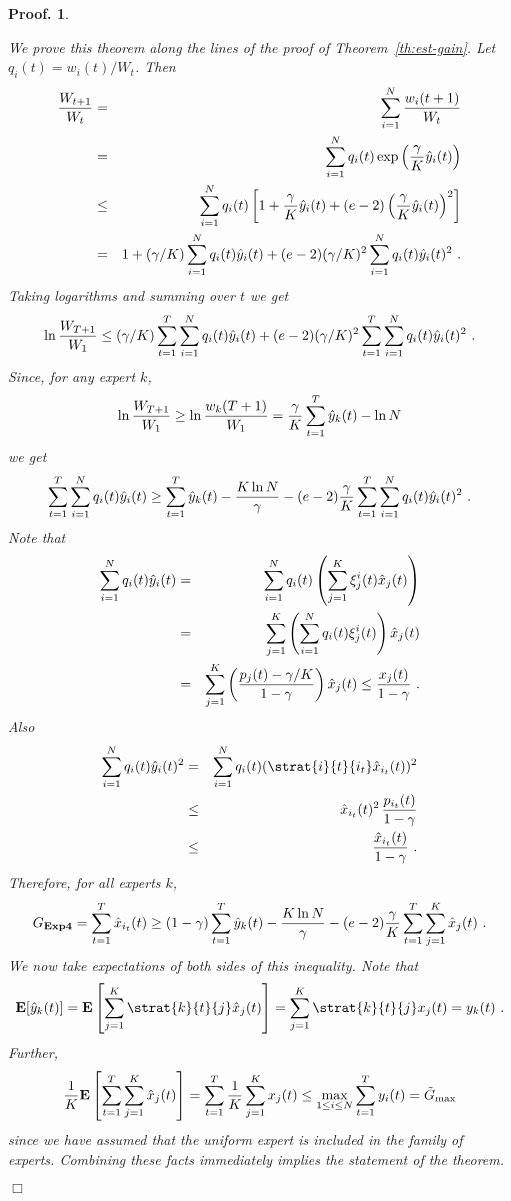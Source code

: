 \documentclass[12pt]{article}
\newcommand{\E}{\mbox{\rm\bf E}}
\newcommand{\Astrat}{{\bf Exp4}}
\newcommand{\brackets}[1]{\left[{#1}\right]}
\newcommand{\expb}[1]{\exp\left(#1\right)}
\newcommand{\x}[2]{x_{#1}({#2})}
\newcommand{\w}[2]{w_{#1}({#2})}
\renewcommand{\i}[1]{i_{#1}}
\newcommand{\Gbestst}{\tilde{G}_{\rm max}}
\newcommand{\p}[2]{p_{#1}(#2)}
\newcommand{\q}[2]{q_{#1}(#2)}
\newcommand{\hx}[2]{\hat{x}_{#1}(#2)}
\newcommand{\hxit}{\hx{\i{t}}{t}}
\newtheorem{pproof}{Proof.}
\newenvironment{proof}{
\begin{pproof}
        \begin{rm}\begin{rm}}{
        \hspace*{\fill} $\Box$
        \end{rm}\end{rm}
        \end{pproof}
}
\begin{document}
\begin{proof}
We prove this theorem along the lines of the proof of Theorem~\ref{th:est-gain}.
Let $\q{i}{t} = \w{i}{t}/W_t$. Then
\begin{eqnarray*}
        \frac{W_{t+1}}{W_{t}} 
& = &
        \sum_{i=1}^N \frac{\w{i}{t+1}}{W_t}
\\ & = &
        \sum_{i=1}^N \q{i}{t} \expb{\frac{\gamma}{K}\hy{i}{t}}
\\ & \leq &
        \sum_{i=1}^N \q{i}{t}
    \left[1 + \frac{\gamma}{K}\hy{i}{t}
        + (e-2)\left(\frac{\gamma}{K}\hy{i}{t}\right)^2 \right]
\\ & = &
        1 + (\gamma/K)\sum_{i=1}^N \q{i}{t} \hy{i}{t}
    + (e-2)(\gamma/K)^2\sum_{i=1}^N \q{i}{t} \hy{i}{t}^2~.
\end{eqnarray*}
Taking logarithms and summing over $t$ we get
\[
        \ln\frac{W_{T+1}}{W_1} \leq (\gamma/K) \sum_{t=1}^T\sum_{i=1}^N \q{i}{t} \hy{i}{t}
        + (e-2)(\gamma/K)^2 \sum_{t=1}^T\sum_{i=1}^N \q{i}{t}\hy{i}{t}^2~.
\]
Since, for any expert $k$,
\[
        \ln\frac{W_{T+1}}{W_1} \geq \ln\frac{\w{k}{T+1}}{W_1}
        = \frac{\gamma}{K}\sum_{t=1}^T \hy{k}{t} - \ln N
\]
we get
\[
    \sum_{t=1}^T \sum_{i=1}^N \q{i}{t}\hy{i}{t}
\geq
    \sum_{t=1}^T \hy{k}{t} - \frac{K\ln N}{\gamma}
    - (e-2)\frac{\gamma}{K}\sum_{t=1}^T\sum_{i=1}^N \q{i}{t}\hy{i}{t}^2~.
\]
Note that
\begin{eqnarray*}
        \sum_{i=1}^N \q{i}{t}\hy{i}{t}
        &=& \sum_{i=1}^N \q{i}{t}\left(\sum_{j=1}^K \xi^i_j(t) \hx{j}{t} \right)
\\ &=&
        \sum_{j=1}^K \left( \sum_{i=1}^N \q{i}{t} \xi^i_j(t) \right) \hx{j}{t}
\\ &=&
        \sum_{j=1}^K \left( \frac{\p{j}{t}-\gamma/K}{1-\gamma} \right) \hx{j}{t}
    \leq \frac{\x{j}{t}}{1-\gamma}~.
\end{eqnarray*}
Also
\begin{eqnarray*}
\sum_{i=1}^N \q{i}{t} \hy{i}{t}^2
&=&
        \sum_{i=1}^N \q{i}{t} (\strat{i}{t}{i_t} \hxit)^2
\\ & \leq &
        \hxit^2\,\frac{\p{i_t}{t}}{1-\gamma}
\\ & \leq &
        \frac{\hxit}{1-\gamma}~.
\end{eqnarray*}
Therefore, for all experts $k$,
\[
    G_{\Astrat} = \sum_{t=1}^T \hxit
\geq
    (1-\gamma)\sum_{t=1}^T \hy{k}{t} - \frac{K\ln N}{\gamma}
    - (e-2)\frac{\gamma}{K}\sum_{t=1}^T\sum_{j=1}^K \hx{j}{t}~.
\]
We now take expectations of both sides of this inequality.
Note that
\[
\E[\hy{k}{t}] = 
  \E\brackets{\sum_{j=1}^K \strat{k}{t}{j} \hx{j}{t}}
=
  \sum_{j=1}^K \strat{k}{t}{j} \x{j}{t} = y_k(t)~.
\]
Further,
\[
\frac{1}{K}\E\brackets{\sum_{t=1}^T \sum_{j=1}^K \hx{j}{t}}
=
\sum_{t=1}^T \frac{1}{K} \sum_{j=1}^K \x{j}{t}
\leq \max_{1 \leq i \leq N} \sum_{t=1}^T y_i(t) = \Gbestst
\]
since we have assumed that the uniform expert is included in the
family of experts.
Combining these facts immediately implies the statement of the theorem.
\end{proof} 
\end{document}
